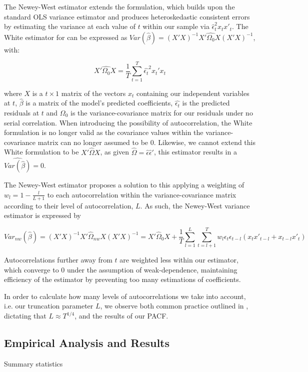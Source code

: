 \documentclass[12pt]{article}
\numberwithin{table}{section}   %
\begin{document}
The Newey-West estimator extends the \citet{white} formulation, which builds upon the standard OLS variance estimator and produces heteroskedastic consistent errors by estimating the variance at each value of $t$ within our sample via $\hat{\epsilon}^2_tx_tx'_t$. The White estimator for can be expressed as $Var(\hat{\beta})=(X'X)^{-1}X'\hat{\Omega_0}X(X'X)^{-1}$, with:

$$
X'\hat{\Omega_0}X=\frac{1}{T}\sum_{t=1}^T\hat{\epsilon_t}^2x_t'x_t
$$

where $X$ is a $t\times1$ matrix of the vectors $x_t$ containing our independent variables at $t$, $\hat{\beta}$ is a matrix of the model’s predicted coefficients, $\hat{\epsilon_t}$ is the predicted residuals at $t$ and $\Omega_0$ is the variance-covariance matrix for our residuals under no serial correlation. When introducing the possibility of autocorrelation, the White formulation is no longer valid as the covariance values within the variance-covariance matrix can no longer assumed to be 0. Likewise, we cannot extend this White formulation to be $X'\hat{\Omega}X$, as given $\hat{\Omega}=\hat{\epsilon}\hat{\epsilon}'$, this estimator results in a $\widehat{Var(\hat{\beta})}=0$.

The Newey-West estimator proposes a solution to this applying a weighting of $w_l=1-\frac{l}{L+1}$ to each autocorrelation within the variance-covariance matrix according to their level of autocorrelation, $L$. As such, the Newey-West variance estimator is expressed by

$$
\widehat{Var_{nw}(\hat{\beta})}=(X'X)^{-1}X'\hat{\Omega}_{nw}X(X'X)^{-1}=X'\hat{\Omega}_0X+\frac{1}{T}\sum^L_{l=1}\sum^T_{t=l+1}w_l\epsilon_t\epsilon_{t-l}(x_tx'_{t-l}+x_{t-l}x'_t)
$$

Autocorrelations further away from $t$ are weighted less within our estimator, which converge to 0 under the assumption of weak-dependence, maintaining efficiency of the estimator by preventing too many estimations of coefficients.

In order to calculate how many levels of autocorrelations we take into account, i.e. our truncation parameter $L$, we observe both common practice outlined in \cite{greene}, dictating that $L\approx{T^{1/4}}$, and the results of our PACF.


\subsection{Empirical Analysis and Results}

\begin{table}[!htbp]
    \caption{Summary statistics} \label{tab:table1}
    \centering
    
\end{table}
\end{document}
